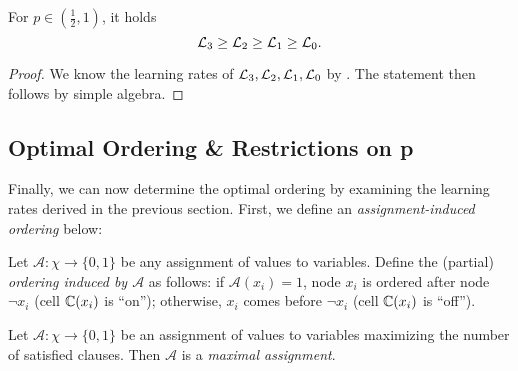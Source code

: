 \begin{lemma}
\label{lemma:CLRComp}
	For $ p \in \left( \frac 12, 1 \right) $, it holds \[
	    \mathcal{L}_3 \geq \mathcal{L}_2 \geq \mathcal{L}_1 \geq \mathcal{L}_0.
	\]
\end{lemma}

\begin{proof}
    We know the learning rates of $ \mathcal{L}_3 ,\mathcal{L}_2 , \mathcal{L}_1 , \mathcal{L}_0 $ by .
    The statement then follows by simple algebra.
\end{proof}


\subsection{Optimal Ordering \& Restrictions on p} 
Finally, we can now determine the optimal ordering by examining the learning rates derived in the previous section. First, we define an \emph{assignment-induced ordering} below:

\begin{definition}
    Let $\mathcal{A}: \chi \to \{0,1\}$ be any assignment of values to variables. Define the (partial) \emph{ordering induced by $\mathcal{A}$} as follows: if $\mathcal{A}(x_i)=1$, node $x_i$ is ordered after node $\lnot x_i$ (cell $\mathbb{C}\!\left(x_i\right)$ is ``on''); otherwise, $x_i$ comes before $\lnot x_i$ (cell $\mathbb{C}\!\left(x_i\right)$ is ``off'').
\end{definition}

\begin{definition}
    Let $\mathcal{A}: \chi \to \{0,1\}$ be an assignment of values to variables maximizing the number of satisfied clauses. Then $\mathcal{A}$ is a \emph{maximal assignment}.
\end{definition}

